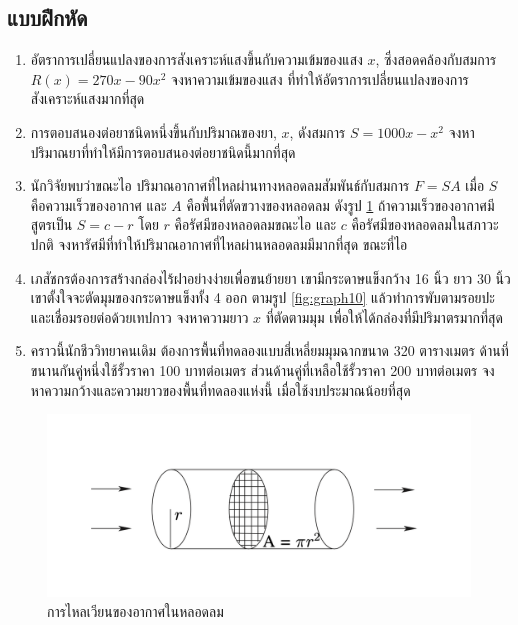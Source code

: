\documentclass[
]{book}
\theoremstyle{definition}
\theoremstyle{definition}
\theoremstyle{definition}
\theoremstyle{definition}
\theoremstyle{remark}
\begin{document}
\subsection{แบบฝึกหัด}\label{uxe41uxe1auxe1auxe1duxe01uxe2buxe14-6}

\begin{enumerate}
\def\labelenumi{\arabic{enumi}.}
\item
  อัตราการเปลี่ยนแปลงของการสังเคราะห์แสงขึ้นกับความเข้มของแสง \(x\),
  ซึ่งสอดคล้องกับสมการ \(R(x)=270x-90x^2\) จงหาความเข้มของแสง
  ที่ทำให้อัตราการเปลี่ยนแปลงของการสังเคราะห์แสงมากที่สุด
\item
  การตอบสนองต่อยาชนิดหนึ่งขึ้นกับปริมาณของยา, \(x\), ดังสมการ \(S=1000x-x^2\)
  จงหาปริมาณยาที่ทำให้มีการตอบสนองต่อยาชนิดนี้มากที่สุด
\item
  นักวิจัยพบว่าขณะไอ ปริมาณอากาศที่ไหลผ่านทางหลอดลมสัมพันธ์กับสมการ \(F=SA\) เมื่อ \(S\)
  คือความเร็วของอากาศ และ \(A\) คือพื้นที่ตัดขวางของหลอดลม ดังรูป
  \ref{fig:graph9} ถ้าความเร็วของอากาศมีสูตรเป็น \(S=c-r\) โดย \(r\)
  คือรัศมีของหลอดลมขณะไอ และ \(c\) คือรัศมีของหลอดลมในสภาวะปกติ
  จงหารัศมีที่ทำให้ปริมาณอากาศที่ไหลผ่านหลอดลมมีมากที่สุด ขณะที่ไอ
\item
  เภสัชกรต้องการสร้างกล่องไร้ฝาอย่างง่ายเพื่อขนย้ายยา เขามีกระดาษแข็งกว้าง 16 นิ้ว
  ยาว 30 นิ้ว เขาตั้งใจจะตัดมุมของกระดาษแข็งทั้ง 4 ออก ตามรูป \ref{fig:graph10}
  แล้วทำการพับตามรอยปะและเชื่อมรอยต่อด้วยเทปกาว จงหาความยาว \(x\) ที่ตัดตามมุม
  เพื่อให้ได้กล่องที่มีปริมาตรมากที่สุด
\item
  คราวนี้นักชีววิทยาคนเดิม ต้องการพื้นที่ทดลองแบบสี่เหลี่ยมมุมฉากขนาด 320 ตารางเมตร
  ด้านที่ขนานกันคู่หนึ่งใช้รั้วราคา 100 บาทต่อเมตร ส่วนด้านคู่ที่เหลือใช้รั้วราคา 200
  บาทต่อเมตร จงหาความกว้างและความยาวของพื้นที่ทดลองแห่งนี้ เมื่อใช้งบประมาณน้อยที่สุด
\end{enumerate}

\begin{figure}

{\centering \includegraphics[width=0.5\linewidth]{images/graph9} 

}

\caption{การไหลเวียนของอากาศในหลอดลม}\label{fig:graph9}
\end{figure}
\end{document}
